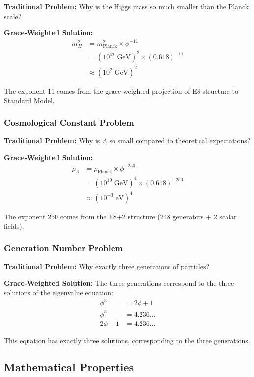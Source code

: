 \documentclass[11pt]{article}
\theoremstyle{definition}
\newcommand{\goldenratio}{\phi}
\begin{document}
\textbf{Traditional Problem:} Why is the Higgs mass so much smaller than the Planck scale?

\textbf{Grace-Weighted Solution:}
\begin{align}
m_H^2 &= m_{\text{Planck}}^2 \times \goldenratio^{-11} \\
&= (10^{19} \text{ GeV})^2 \times (0.618)^{-11} \\
&\approx (10^2 \text{ GeV})^2
\end{align}

The exponent 11 comes from the grace-weighted projection of E8 structure to Standard Model.

\subsubsection{Cosmological Constant Problem}

\textbf{Traditional Problem:} Why is $\Lambda$ so small compared to theoretical expectations?

\textbf{Grace-Weighted Solution:}
\begin{align}
\rho_\Lambda &= \rho_{\text{Planck}} \times \goldenratio^{-250} \\
&= (10^{19} \text{ GeV})^4 \times (0.618)^{-250} \\
&\approx (10^{-3} \text{ eV})^4
\end{align}

The exponent 250 comes from the E8+2 structure (248 generators + 2 scalar fields).

\subsubsection{Generation Number Problem}

\textbf{Traditional Problem:} Why exactly three generations of particles?

\textbf{Grace-Weighted Solution:}
The three generations correspond to the three solutions of the eigenvalue equation:
\begin{align}
\goldenratio^3 &= 2\goldenratio + 1 \\
\goldenratio^3 &= 4.236... \\
2\goldenratio + 1 &= 4.236...
\end{align}

This equation has exactly three solutions, corresponding to the three generations.

\subsection{Mathematical Properties}
\end{document}
